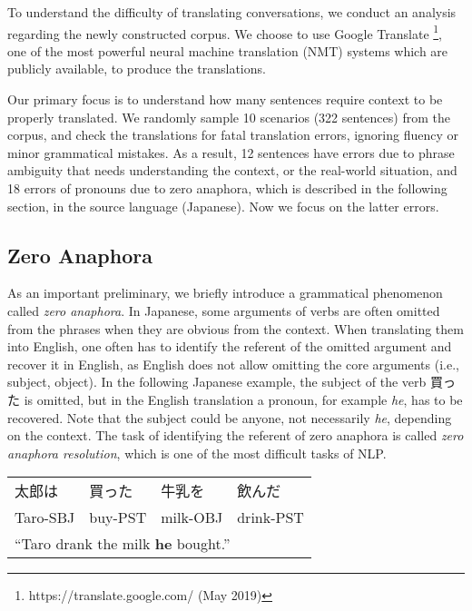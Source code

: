 \documentclass[11pt,a4paper]{article}
\begin{document}
To understand the difficulty of translating conversations, we conduct an analysis regarding the newly constructed corpus. We choose to use Google Translate \footnote{https://translate.google.com/ (May 2019)}, one of the most powerful neural machine translation (NMT) systems which are publicly available, to produce the translations.


Our primary focus is to understand how many sentences require context to be properly translated. We randomly sample 10 scenarios (322 sentences) from the corpus, and check the translations for fatal translation errors, ignoring fluency or minor grammatical mistakes. As a result, 12 sentences have errors due to phrase ambiguity that needs understanding the context, or the real-world situation, and 18 errors of pronouns due to zero anaphora, which is described in the following section, in the source language (Japanese). Now we focus on the latter errors.

\subsection{Zero Anaphora}
\label{sec:anaphora}
\begin{CJK}{UTF8}{min}
As an important preliminary, we briefly introduce a grammatical phenomenon called {\it zero anaphora}. In Japanese, some arguments of verbs are often omitted from the phrases when they are obvious from the context. When translating them into English, one often has to identify the referent of the omitted argument and recover it in English, as English does not allow omitting the core arguments (i.e., subject, object). In the following Japanese example, the subject of the verb 買った is omitted, but in the English translation a pronoun, for example {\it he}, has to be recovered. Note that the subject could be anyone, not necessarily {\it he}, depending on the context. The task of identifying the referent of zero anaphora is called {\it zero anaphora resolution}, which is one of the most difficult tasks of NLP.


    \begin{table}[h]
    \begin{small}
      \begin{tabular}{llll}
太郎は  & 買った& 牛乳を & 飲んだ \\
        Taro-SBJ & buy-PST & milk-OBJ & drink-PST \\
        \multicolumn{4}{l}{``Taro drank the milk {\bf he} bought.''}
      \end{tabular}
    \end{small}
    \end{table}

\end{CJK}
\end{document}
